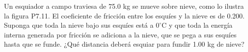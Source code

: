 \item Un esquiador a campo traviesa de 75.0 kg se mueve sobre nieve, como lo ilustra la figura P7.11. El coeficiente de fricción entre los esquíes y la nieve es de 0.200. Suponga que toda la nieve bajo sus esquíes está a $0^\circ\text{C}$ y que toda la energía interna generada por fricción se adiciona a la nieve, que se pega a sus esquíes hasta que se funde. ¿Qué distancia deberá esquiar para fundir 1.00 kg de nieve?
